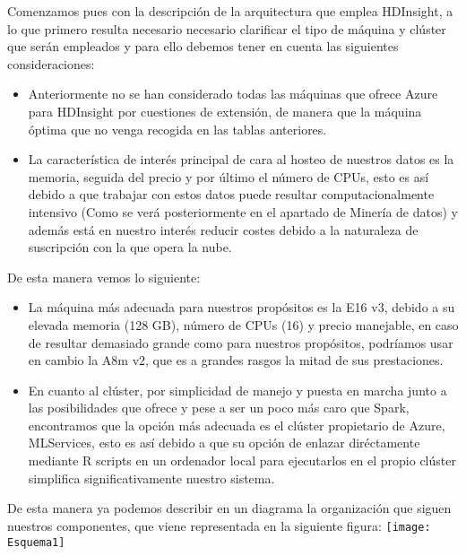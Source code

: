 \documentclass[11pt, a4paper]{article} %
\begin{document}
Comenzamos pues con la descripción de la arquitectura que emplea HDInsight, a lo que primero resulta necesario necesario clarificar el tipo de máquina y clúster que serán empleados y para ello debemos tener en cuenta las siguientes consideraciones:
\begin{itemize}
\item Anteriormente no se han considerado todas las máquinas que ofrece Azure para HDInsight por cuestiones de extensión, de manera que la máquina óptima que no venga recogida en las tablas anteriores.
\item La característica de interés principal de cara al hosteo de nuestros datos es la memoria, seguida del precio y por último el número de CPUs, esto es así debido a que trabajar con estos datos puede resultar computacionalmente intensivo (Como se verá posteriormente en el apartado de Minería de datos) y además está en nuestro interés reducir costes debido a la naturaleza de suscripción con la que opera la nube.
\end{itemize}
De esta manera vemos lo siguiente:
\begin{itemize}
\item La máquina más adecuada para nuestros propósitos es la E16 v3, debido a su elevada memoria (128 GB), número de CPUs (16) y precio manejable, en caso de resultar demasiado grande como para nuestros propósitos, podríamos usar en cambio la A8m v2, que es a grandes rasgos la mitad de sus prestaciones. \cite{docazure}
\item En cuanto al clúster, por simplicidad de manejo y puesta en marcha junto a las posibilidades que ofrece y pese a ser un poco más caro que Spark, encontramos que la opción más adecuada es el clúster propietario de Azure, MLServices, esto es así debido a que su opción de enlazar diréctamente mediante R scripts en un ordenador local para ejecutarlos en el propio clúster simplifica significativamente nuestro sistema.
\end{itemize}
De esta manera ya podemos describir en un diagrama la organización que siguen nuestros componentes, que viene representada en la siguiente figura:
\texttt{[image: Esquema1]}
\end{document}

